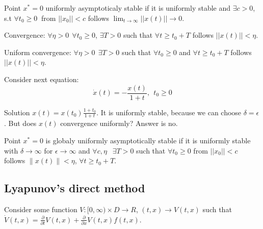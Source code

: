 \begin{Definition}
 Point $x^*=0$ uniformly asymptoticaly stable if it is uniformly stable and 
 $\exists c>0$, s.t $\forall t_0 \ge 0\ $ from $||x_0||<c$
 follows $\lim_{t\to \infty} ||x(t)|| \to 0$.
\end{Definition}


\begin{Definition}
 Convergence: $\forall \eta > 0 \ \ \forall t_0 \ge 0$, $\exists T>0$ such
 that $\forall t \ge t_0+T$ follows $||x(t)||<\eta$.
\end{Definition}

\begin{Definition}
 Uniform convergence: $\forall \eta > 0 \ \ \exists T>0$ such
 that $\forall t_0 \ge 0$ and $\forall t \ge t_0+T$ follows $||x(t)||<\eta$.
\end{Definition}


\begin{Example}
Consider next equation:
 \begin{equation*}
   \dot x(t) = -\frac{x(t)}{1+t}, \ \ t_0\ge 0
 \end{equation*}

 Solution $x(t)=x(t_0)\frac{1+t_0}{1+t}$. It is uniformly stable,
 because we can choose $\delta = \epsilon$. But does $x(t)$ convergence
 uniformly? Answer is no. 
\end{Example}

\begin{Definition}
 Point $x^*=0$ is globaly uniformly asymptotically stable if it is uniformly stable
 with $\delta \to \infty$ for $\epsilon \to \infty$ and $\forall c,\eta\ \ $ 
 $\exists T>0$ such that $\forall t_0\ge0$ from $||x_0||<c$ follows 
 $\|x(t)\|<\eta$, $\forall t \ge t_0 + T$.
\end{Definition}


\subsection{Lyapunov's direct method}

Consider some function $V:[0,\infty)\times D\to R$, $(t,x)\to V(t,x)$ such that
$\dot V(t,x)=\frac{\partial}{\partial t}V(t,x)+\frac{\partial}{\partial x}V(t,x) f(t,x)$.

